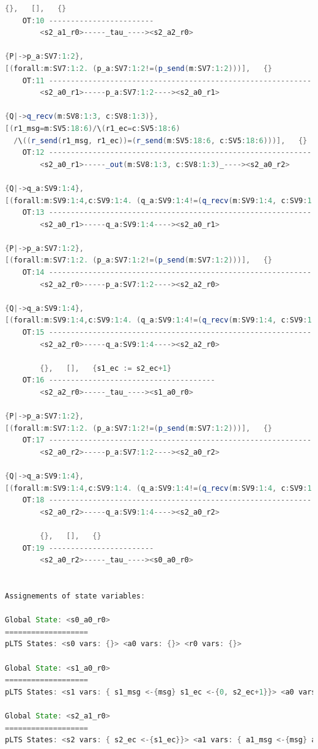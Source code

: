 \documentclass{lmcs}
\begin{document}
\begin{lstlisting}[basicstyle=\scriptsize\ttfamily, language=java, frame=single]
		{},   [],   {}
	OT:10 ------------------------
		<s2_a1_r0>-----_tau_----><s2_a2_r0>

{P|->p_a:SV7:1:2},
[(forall:m:SV7:1:2. (p_a:SV7:1:2!=(p_send(m:SV7:1:2)))],   {}
	OT:11 ------------------------------------------------------------
		<s2_a0_r1>-----p_a:SV7:1:2----><s2_a0_r1>

{Q|->q_recv(m:SV8:1:3, c:SV8:1:3)},
[(r1_msg=m:SV5:18:6)/\(r1_ec=c:SV5:18:6)
  /\((r_send(r1_msg, r1_ec))=(r_send(m:SV5:18:6, c:SV5:18:6)))],   {}
	OT:12 ------------------------------------------------------------
		<s2_a0_r1>-----_out(m:SV8:1:3, c:SV8:1:3)_----><s2_a0_r2>

{Q|->q_a:SV9:1:4},
[(forall:m:SV9:1:4,c:SV9:1:4. (q_a:SV9:1:4!=(q_recv(m:SV9:1:4, c:SV9:1:4)))],   {}
	OT:13 ------------------------------------------------------------
		<s2_a0_r1>-----q_a:SV9:1:4----><s2_a0_r1>

{P|->p_a:SV7:1:2},
[(forall:m:SV7:1:2. (p_a:SV7:1:2!=(p_send(m:SV7:1:2)))],   {}
	OT:14 ------------------------------------------------------------
		<s2_a2_r0>-----p_a:SV7:1:2----><s2_a2_r0>

{Q|->q_a:SV9:1:4},
[(forall:m:SV9:1:4,c:SV9:1:4. (q_a:SV9:1:4!=(q_recv(m:SV9:1:4, c:SV9:1:4)))],   {}
	OT:15 ------------------------------------------------------------
		<s2_a2_r0>-----q_a:SV9:1:4----><s2_a2_r0>

		{},   [],   {s1_ec := s2_ec+1}
	OT:16 --------------------------------------
		<s2_a2_r0>-----_tau_----><s1_a0_r0>

{P|->p_a:SV7:1:2},
[(forall:m:SV7:1:2. (p_a:SV7:1:2!=(p_send(m:SV7:1:2)))],   {}
	OT:17 ------------------------------------------------------------
		<s2_a0_r2>-----p_a:SV7:1:2----><s2_a0_r2>

{Q|->q_a:SV9:1:4},
[(forall:m:SV9:1:4,c:SV9:1:4. (q_a:SV9:1:4!=(q_recv(m:SV9:1:4, c:SV9:1:4)))],   {}
	OT:18 ------------------------------------------------------------
		<s2_a0_r2>-----q_a:SV9:1:4----><s2_a0_r2>

		{},   [],   {}
	OT:19 ------------------------
		<s2_a0_r2>-----_tau_----><s0_a0_r0>


Assignements of state variables:

Global State: <s0_a0_r0>
===================
pLTS States: <s0 vars: {}> <a0 vars: {}> <r0 vars: {}>

Global State: <s1_a0_r0>
===================
pLTS States: <s1 vars: { s1_msg <-{msg} s1_ec <-{0, s2_ec+1}}> <a0 vars: {}> <r0 vars: {}>

Global State: <s2_a1_r0>
===================
pLTS States: <s2 vars: { s2_ec <-{s1_ec}}> <a1 vars: { a1_msg <-{msg} a1_ec <-{c}}> <r0 vars: {}>


\end{lstlisting}
\end{document}

